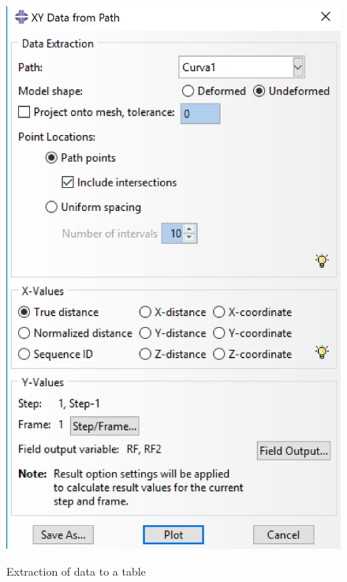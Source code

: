 \documentclass[english,a4paper,12pt]{article}
\begin{document}
\begin{enumerate}
\begin{figure}[h!tp]
\begin{center}
\quad
    {\includegraphics[scale=0.45]{capturas2019/a_fig40pb.png}}
  \end{center}
  \caption{Extraction of data to a table}
  \label{fig26}
\end{figure}

\end{enumerate}
\end{document}
